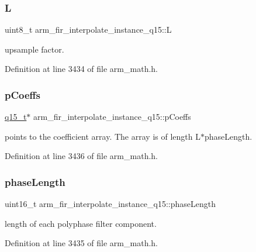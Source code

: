 \subsubsection{\texorpdfstring{L}{L}}
{\footnotesize\ttfamily uint8\+\_\+t arm\+\_\+fir\+\_\+interpolate\+\_\+instance\+\_\+q15\+::L}

upsample factor. 

Definition at line 3434 of file arm\+\_\+math.\+h.

\mbox{\label{structarm__fir__interpolate__instance__q15_a767d91d61d4c0beeddd4325d28d28e24}} 
\subsubsection{\texorpdfstring{p\+Coeffs}{pCoeffs}}
{\footnotesize\ttfamily \hyperlink{arm__math_8h_ab5a8fb21a5b3b983d5f54f31614052ea}{q15\+\_\+t}$\ast$ arm\+\_\+fir\+\_\+interpolate\+\_\+instance\+\_\+q15\+::p\+Coeffs}

points to the coefficient array. The array is of length L$\ast$phase\+Length. 

Definition at line 3436 of file arm\+\_\+math.\+h.

\mbox{\label{structarm__fir__interpolate__instance__q15_ad5178a02a697a77e0d0e60705d9f0a19}} 
\subsubsection{\texorpdfstring{phase\+Length}{phaseLength}}
{\footnotesize\ttfamily uint16\+\_\+t arm\+\_\+fir\+\_\+interpolate\+\_\+instance\+\_\+q15\+::phase\+Length}

length of each polyphase filter component. 

Definition at line 3435 of file arm\+\_\+math.\+h.


